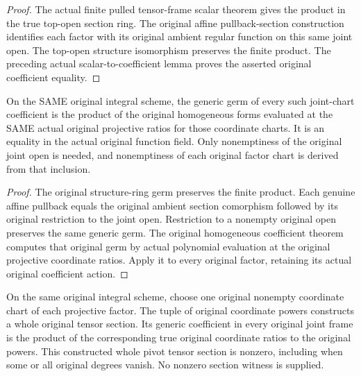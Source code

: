 \begin{proof}
The actual finite pulled tensor-frame scalar theorem gives the product in the true top-open section ring. The original affine pullback-section construction identifies each factor with its original ambient regular function on this same joint open. The top-open structure isomorphism preserves the finite product. The preceding actual scalar-to-coefficient lemma proves the asserted original coefficient equality.
\end{proof}
\begin{theorem}\label{thm:original-finite-projective-tensor-form-generic-coefficients}
\leanok
{}
On the SAME original integral scheme, the generic germ of every such joint-chart coefficient is the product of the original homogeneous forms evaluated at the SAME actual original projective ratios for those coordinate charts. It is an equality in the actual original function field. Only nonemptiness of the original joint open is needed, and nonemptiness of each original factor chart is derived from that inclusion.
\end{theorem}
\begin{proof}
The original structure-ring germ preserves the finite product. Each genuine affine pullback equals the original ambient section comorphism followed by its original restriction to the joint open. Restriction to a nonempty original open preserves the same generic germ. The original homogeneous coefficient theorem computes that original germ by actual polynomial evaluation at the original projective coordinate ratios. Apply it to every original factor, retaining its actual original coefficient action.
\end{proof}
\begin{theorem}\label{thm:original-finite-projective-tensor-pivot-nonzero}
\leanok
{}
On the same original integral scheme, choose one original nonempty coordinate chart of each projective factor. The tuple of original coordinate powers constructs a whole original tensor section. Its generic coefficient in every original joint frame is the product of the corresponding true original coordinate ratios to the original powers. This constructed whole pivot tensor section is nonzero, including when some or all original degrees vanish. No nonzero section witness is supplied.
\end{theorem}
